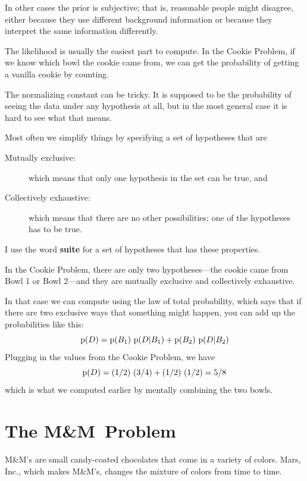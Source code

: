 \documentclass[12pt]{book}
\begin{document}
In other cases the prior
is subjective; that is, reasonable people might disagree,
either because they use different background information
or because they interpret the same information differently.

The likelihood is usually the easiest part to compute.  In the
Cookie Problem, if we know which bowl the cookie came from,
we can get the probability of getting a vanilla cookie by counting.

The normalizing constant can be tricky.  It is supposed to be the
probability of seeing the data under any hypothesis at all, but in the
most general case it is hard to see what that means.

Most often we simplify things by specifying a set of hypotheses
that are

\begin{description}

\item[Mutually exclusive:] which means that only one hypothesis in
the set can be true, and

\item[Collectively exhaustive:] which means that there are no other
possibilities; one of the hypotheses has to be true.

\end{description}

I use the word {\bf suite} for a set of hypotheses that has these
properties.

In the Cookie Problem, there are only two hypotheses---the cookie
came from Bowl 1 or Bowl 2---and they are mutually exclusive and
collectively exhaustive.

In that case we can compute  using the law of total probability,
which says that if there are two exclusive ways that something
might happen, you can add up the probabilities like this:
%
\[ \mathrm{p}(D) = \mathrm{p}(B_1)~\mathrm{p}(D|B_1) + \mathrm{p}(B_2)~\mathrm{p}(D|B_2) \]
%
Plugging in the values from the Cookie Problem, we have
%
\[ \mathrm{p}(D) = (1/2)~(3/4) + (1/2)~(1/2) = 5/8 \]
%
which is what we computed earlier by mentally combining the two
bowls.


\newcommand{\MM}{M\&M}

\section{The \MM~Problem}

\MM's are small candy-coated chocolates that come in a variety of
colors.  Mars, Inc., which makes \MM's, changes the mixture of
colors from time to time.
\end{document}
